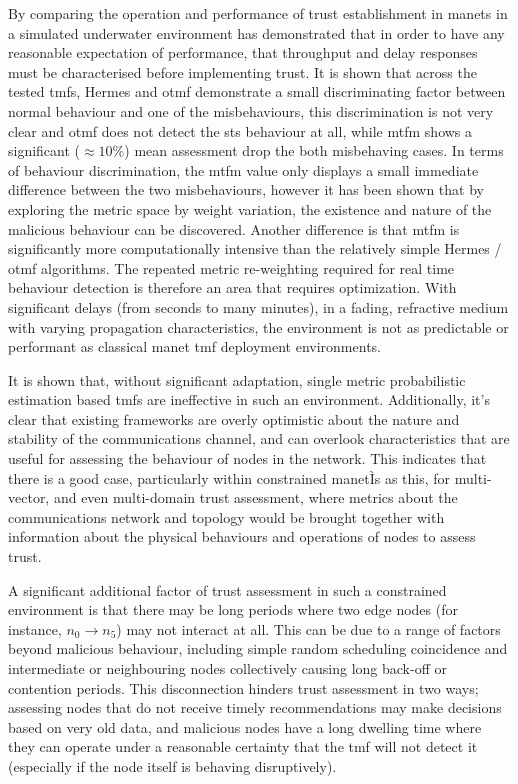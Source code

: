 By comparing the operation and performance of trust establishment in \glspl{manet} in a simulated underwater environment has demonstrated that in order to have any reasonable expectation of performance, that throughput and delay responses must be characterised before implementing trust. 
It is shown that across the tested \glspl{tmf}, Hermes and \gls{otmf} demonstrate a small discriminating factor between normal behaviour and one of the misbehaviours, this discrimination is not very clear and \gls{otmf} does not detect the \gls{sts} behaviour at all, while \gls{mtfm} shows a significant ($\approx 10\%$) mean assessment drop the both misbehaving cases. 
In terms of behaviour discrimination, the \gls{mtfm} value only displays a small immediate difference between the two misbehaviours, however it has been shown that by exploring the metric space by weight variation, the existence and nature of the malicious behaviour can be discovered.
Another difference is that \gls{mtfm} is significantly more computationally intensive than the relatively simple Hermes / \gls{otmf} algorithms.
The repeated metric re-weighting required for real time behaviour detection is therefore an area that requires optimization.
With significant delays (from seconds to many minutes), in a fading, refractive medium with varying propagation characteristics, the environment is not as predictable or performant as classical \gls{manet} \gls{tmf} deployment environments.

It is shown that, without significant adaptation, single metric probabilistic estimation based \glspl{tmf} are ineffective in such an environment.
Additionally, it's clear that existing frameworks are overly optimistic about the nature and stability of the communications channel, and can overlook characteristics that are useful for assessing the behaviour of nodes in the network. 
This indicates that there is a good case, particularly within constrained \gls{manet}Ìs as this, for multi-vector, and even multi-domain trust assessment, where metrics about the communications network and topology would be brought together with information about the physical behaviours and operations of nodes to assess trust.

A significant additional factor of trust assessment in such a constrained environment is that there may be long periods where two edge nodes (for instance, $n_0 \to n_5$) may not interact at all. 
This can be due to a range of factors beyond malicious behaviour, including simple random scheduling coincidence and intermediate or neighbouring nodes collectively causing long back-off or contention periods.
This disconnection hinders trust assessment in two ways; assessing nodes that do not receive timely recommendations may make decisions based on very old data, and malicious nodes have a long dwelling time where they can operate under a reasonable certainty that the \gls{tmf} will not detect it (especially if the node itself is behaving disruptively).


